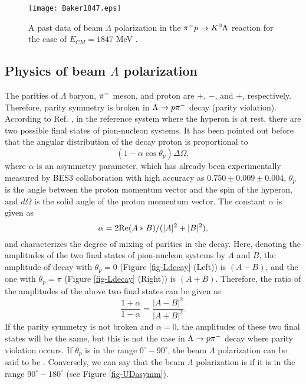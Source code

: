 \begin{figure}[h]
  \centering
  \texttt{[image: Baker1847.eps]}
  \caption{A past data of beam $\Lambda$ polarization in the $\pi^- p \to K^0 \Lambda$ reaction for the case of $E_{CM}=1847$ MeV \cite{Baker}.}
  \label{fig-Baker1847}
\end{figure}

\subsection{Physics of beam $\Lambda$ polarization}
\label{sec-Pl-phys}

The parities of $\Lambda$ baryon, $\pi^{-}$ meson, and proton are $+$, $-$, and $+$, respectively. Therefore, parity symmetry is broken in $\Lambda\to p\pi^{-}$ decay (parity violation). According to Ref. \cite{Lee1957}, in the reference system where the hyperon is at rest, there are two possible final states of pion-nucleon systems. It has been pointed out before \cite{Weldman} that the angular distribution of the decay proton is proportional to 
\begin{equation}
  (1-\alpha\cos{\theta_{p}}) \Delta\Omega,
\end{equation}
where $\alpha$ is an asymmetry parameter, which has already been experimentally measured by BES3 collaboration \cite{Alpha} with high accuracy as $0.750\pm0.009\pm0.004$, $\theta_{p}$ is the angle between the proton momentum vector and the spin of the hyperon, and $d\Omega$ is the solid angle of the proton momentum vector. The constant $\alpha$ is given as 
\begin{equation}
  \alpha = 2 {\rm Re}(A*B) / (|A|^{2} + |B|^{2}),
\end{equation}
and characterizes the degree of mixing of parities in the decay. Here, denoting the amplitudes of the two final states of pion-nucleon systems by $A$ and $B$, the amplitude of decay with $\theta_{p}=0$ (Figure \ref{fig-Ldecay} (Left)) is $(A-B)$, and the one with $\theta_{p}=\pi$ (Figure \ref{fig-Ldecay} (Right)) is $(A+B)$. Therefore, the ratio of the amplitudes of the above two final states can be given as
\begin{equation}
  \frac{1+\alpha}{1-\alpha} = \frac{|A-B|^{2}}{|A+B|^{2}}.
\end{equation}
If the parity symmetry is not broken and $\alpha=0$, the amplitudes of these two final states will be the same, but this is not the case in $\Lambda\to p\pi^{-}$ decay where parity violation occurs. If $\theta_{p}$ is in the range $0^{\circ}-90^{\circ}$, the beam $\Lambda$ polarization can be said to be . Conversely, we can say that the beam $\Lambda$ polarization is  if it is in the range $90^{\circ}-180^{\circ}$ (see Figure \ref{fig-UDasymm}). 

